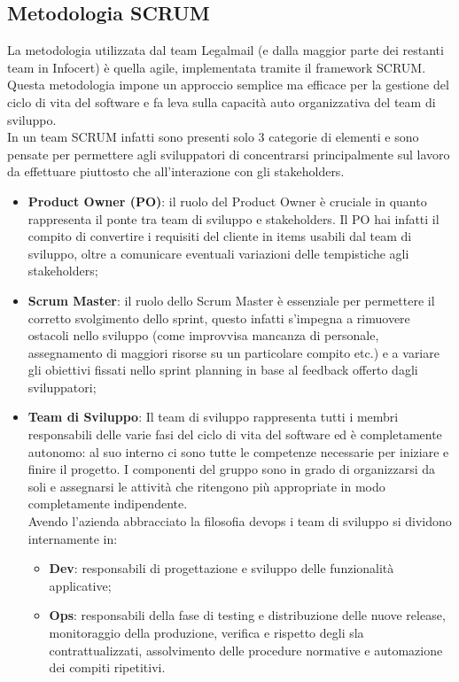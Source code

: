 \subsection{Metodologia SCRUM}
La metodologia utilizzata dal team Legalmail (e dalla maggior parte dei restanti team in Infocert) è quella \gls{agile}, implementata tramite il \gls{framework} SCRUM.
Questa metodologia impone un approccio semplice ma efficace per la gestione del ciclo di vita del software e fa leva sulla capacità auto organizzativa del team di sviluppo. \\
In un team SCRUM infatti sono presenti solo 3 categorie di elementi e sono pensate per permettere agli sviluppatori di concentrarsi principalmente sul lavoro da effettuare piuttosto che all'interazione con gli \gls{stakeholders}.
\begin{itemize}
	\item \textbf{Product Owner (PO)}: il ruolo del Product Owner è cruciale in quanto rappresenta il ponte tra team di sviluppo e stakeholders. Il PO hai infatti il compito di convertire i requisiti del cliente in items usabili dal team di sviluppo, oltre a comunicare eventuali variazioni delle tempistiche agli stakeholders;
	\item \textbf{Scrum Master}: il ruolo dello Scrum Master è essenziale per permettere il corretto svolgimento dello sprint, questo infatti s'impegna a rimuovere ostacoli nello sviluppo (come improvvisa mancanza di personale, assegnamento di maggiori risorse su un particolare compito etc.) e a variare gli obiettivi fissati nello sprint planning in base al feedback offerto dagli sviluppatori;
	\item \textbf{Team di Sviluppo}: Il team di sviluppo rappresenta tutti i membri responsabili delle varie fasi del ciclo di vita del software ed è completamente autonomo: al suo interno ci sono tutte le competenze necessarie per iniziare e finire il progetto. I componenti del gruppo sono in grado di organizzarsi da soli e assegnarsi le attività che ritengono più appropriate in modo completamente indipendente. \\
	Avendo l'azienda abbracciato la filosofia \gls{devops} i team di sviluppo si dividono internamente in:
	\begin{itemize}
		\item \textbf{Dev}: responsabili di progettazione e sviluppo delle funzionalità applicative;
		\item \textbf{Ops}: responsabili della fase di testing e distribuzione delle nuove \gls{release}, monitoraggio della produzione, verifica e rispetto degli \gls{sla} contrattualizzati, assolvimento delle procedure normative e automazione dei compiti ripetitivi.
	\end{itemize}
\end{itemize}

